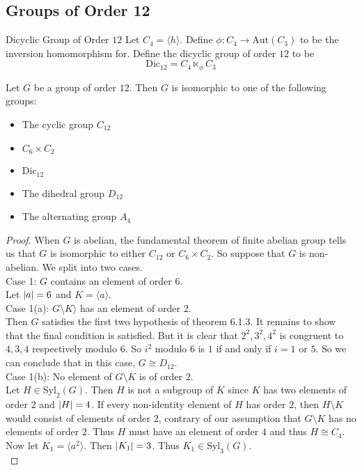 \documentclass[a4paper]{article}
\begin{document}
\subsection{Groups of Order 12}
\begin{defn}{Dicyclic Group of Order $12$}{} Let $C_4=\langle h\rangle$. Define $\phi:C_4\to\text{Aut}(C_3)$ to be the inversion homomorphism for. Define the dicyclic group of order $12$ to be $$\text{Dic}_{12}=C_4\ltimes_\phi C_3$$ 
\end{defn}

\begin{thm}{}{} Let $G$ be a group of order $12$. Then $G$ is isomorphic to one of the following groups: 
\begin{itemize}
\item The cyclic group $C_{12}$
\item $C_6\times C_2$
\item $\text{Dic}_{12}$
\item The dihedral group $D_{12}$
\item The alternating group $A_4$
\end{itemize} 
\begin{proof}
When $G$ is abelian, the fundamental theorem of finite abelian group tells us that $G$ is isomorphic to either $C_{12}$ or $C_6\times C_2$. So suppose that $G$ is non-abelian. We split into two cases. \\

Case 1: $G$ contains an element of order $6$. \\
Let $\abs{a}=6$ and $K=\langle a\rangle$. \\

Case 1(a): $G\setminus K\rangle$ has an element of order $2$. \\
Then $G$ satisfies the first two hypothesis of theorem 6.1.3. It remains to show that the final condition is satisfied. But it is clear that $2^2,3^2,4^2$ is congruent to $4,3,4$ respectively modulo $6$. So $i^2$ modulo $6$ is $1$ if and only if $i=1$ or $5$. So we can conclude that in this case, $G\cong D_{12}$. \\

Case 1(b): No element of $G\setminus K$ is of order $2$. \\
Let $H\in\text{Syl}_2(G)$. Then $H$ is not a subgroup of $K$ since $K$ has two elements of order $2$ and $\abs{H}=4$. If every non-identity element of $H$ has order $2$, then $H\setminus K$ would consist of elements of order $2$, contrary of our assumption that $G\setminus K$ has no elements of order $2$. Thus $H$ must have an element of order $4$ and thus $H\cong C_4$. Now let $K_1=\langle a^2\rangle$. Then $\abs{K_1}=3$. Thus $K_1\in\text{Syl}_3(G)$. \\


\end{proof}
\end{thm}
\end{document}
